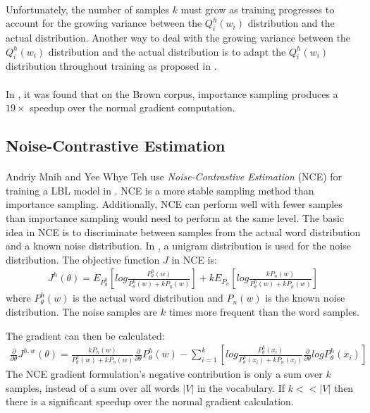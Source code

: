 \paragraph{}
Unfortunately, the number of samples $k$ must grow as training progresses to account for the growing variance between the $Q^h_i(w_i)$ distribution and the actual distribution. 
Another way to deal with the growing variance between the $Q^h_i(w_i)$ distribution and the actual distribution is to adapt the $Q^h_i(w_i)$ distribution throughout training as proposed in \cite{BengioSenecal2008}.
\paragraph{}
In \cite{BengioSenecal2003}, it was found that on the Brown corpus, importance sampling produces a $19\times$ speedup over the normal gradient computation.

\subsection{Noise-Contrastive Estimation}
\paragraph{}
Andriy Mnih and Yee Whye Teh use \emph{Noise-Contrastive Estimation} (NCE) for training a LBL model in \cite{MnihTeh2012}. NCE is a more stable sampling method than importance sampling. Additionally, NCE can perform well with fewer samples than importance sampling would need to perform at the same level.
The basic idea in NCE is to discriminate between samples from the actual word distribution and a known noise distribution. In \cite{MnihTeh2012}, a unigram distribution is used for the noise distribution.
The objective function $J$ in NCE is:
\begin{align}
J^h(\theta) = E_{P_d^h} \left[ log \frac { P_{\theta}^h(w) } {P_{\theta}^h(w) + k P_n(w)} \right] + kE_{P_n} \left[ log \frac { k P_n(w) } {P_{\theta}^h(w) + k P_n(w)} \right]
\end{align}
where $P_{\theta}^h(w)$ is the actual word distribution and $P_n(w)$ is the known noise distribution. The noise samples are $k$ times more frequent than the word samples.

The gradient can then be calculated:
\begin{align}
\frac{\partial}{\partial \theta} J^{h,w}(\theta) = \frac {  k P_n(w)  } {P_{\theta}^h(w) + k P_n(w)}  \frac{\partial}{\partial \theta}  P_{\theta}^h(w)
- \sum_{i=1}^{k} \left[ log \frac { P_{\theta}^h(x_i) } {P_{\theta}^h(x_i) + k P_n(x_i)} \frac{\partial}{\partial \theta} log P_{\theta}^h(x_i) \right]
\end{align}
The NCE gradient formulation's negative contribution is only a sum over $k$ samples, instead of a sum over all words $|V|$ in the vocabulary. If $k << |V|$ then there is a significant speedup over the normal gradient calculation.
